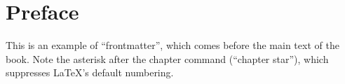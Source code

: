 \chapter*{Preface}

This is an example of ``frontmatter'', which comes before the main text of the book. Note the asterisk after the chapter command (``chapter star''), which suppresses \LaTeX's default numbering.
